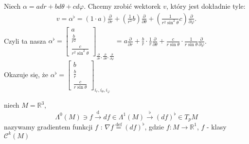 \documentclass[../main.tex]{subfiles}
\begin{document}
    \begin{przyklad}
        Niech $\alpha = a dr + b d\theta + c d\varphi$. Chcemy zrobić wektorek $v$, który jest dokładnie tyle:
        \begin{align*}
            v = \alpha^\flat = \left( 1\cdot a \right) \frac{\partial }{\partial r} + \left( \frac{1}{r^2}b \right) \frac{\partial }{\partial \theta} + \left( \frac{1}{r^2\sin^2\theta} c \right) \frac{\partial }{\partial \varphi}
        .\end{align*}
        Czyli ta nasza $\alpha^\flat = \begin{bmatrix} a \\ \frac{b}{r^2} \\ \frac{c}{r^2 \sin^2\theta} \end{bmatrix}_{\frac{\partial }{\partial r} , \frac{\partial }{\partial \theta} , \frac{\partial }{\partial \varphi} } = a \frac{\partial }{\partial r} + \frac{b}{r} \cdot \frac{1}{r} \frac{\partial }{\partial \theta} + \frac{c}{r\sin\theta} \cdot \frac{1}{r\sin\theta} \frac{\partial }{\partial \varphi} $.\\
        Okazuje się, że $\alpha^\flat = \begin{bmatrix} b\\ \frac{b}{r} \\ \frac{c}{r\sin\theta} \end{bmatrix}_{i_r, i_\theta, i_\varphi}$
    \end{przyklad}
    \begin{definicja}
        niech $M = \mathbb{R}^3$,
        \[
            \Lambda^0(M)\ni f \overset{\text{d}}{\to} df\in \Lambda^1(M) \overset{\flat}{\to} \left( df \right) ^\flat \in T_pM
        \]
        nazywamy gradientem funkcji $f$ : $\nabla f \overset{\text{def}}{=} \left( df \right) ^\flat$, gdzie $f: M\to \mathbb{R}^1$, $f$ - klasy $\mathcal{C}^k(M)$
    \end{definicja}
\end{document}
